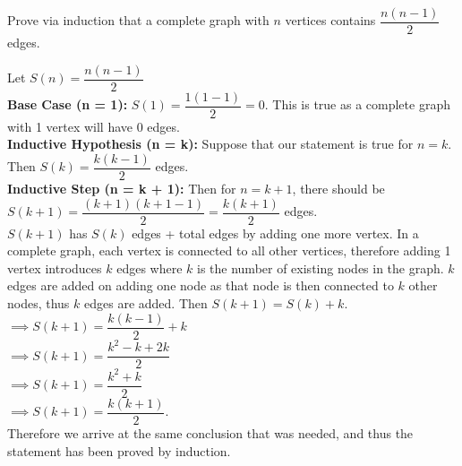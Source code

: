 \documentclass[addpoints]{exam}
\begin{document}
\begin{questions}
\question[5] Prove via induction that a complete graph with $n$ vertices contains $\dfrac{n(n-1)}{2}$ edges.
  \begin{solution}
    Let $S(n) = \dfrac{n(n-1)}{2}$ \\
    \textbf{Base Case (n = 1):} $S(1) = \dfrac{1(1-1)}{2} = 0$. This is true as a complete graph with 1 vertex will have 0 edges. \\
    \textbf{Inductive Hypothesis (n = k):} Suppose that our statement is true for $n = k$. Then $S(k) = \dfrac{k(k-1)}{2}$ edges. \\
    \textbf{Inductive Step (n = k + 1):} Then for $n = k + 1$, there should be $S(k + 1) = \dfrac{(k+1)(k+1-1)}{2} = \dfrac{k(k+1)}{2}$ edges. \\
    $S(k+1)$ has $S(k)$ edges + total edges by adding one more vertex. In a complete graph, each vertex is connected to all other vertices,
    therefore adding 1 vertex introduces $k$ edges where $k$ is the number of existing nodes in the graph. $k$ edges are added on adding one node as 
    that node is then connected to $k$ other nodes, thus $k$ edges are added.
    Then $S(k+1) = S(k) + k$. \\
    $\implies S(k + 1) = \dfrac{k(k-1)}{2} + k$ \\
    $\implies S(k + 1) = \dfrac{k^2 - k + 2k}{2}$ \\
    $\implies S(k + 1) = \dfrac{k^2 + k}{2}$ \\
    $\implies S(k + 1) = \dfrac{k(k + 1)}{2}$. \\
    Therefore we arrive at the same conclusion that was needed, and thus the statement has been proved by induction.
  \end{solution}
  
\end{questions}
\end{document}
